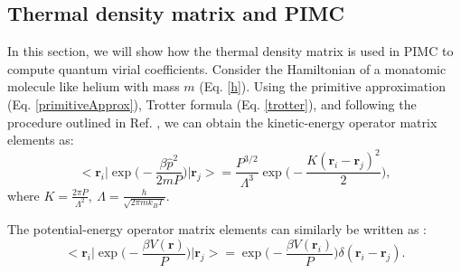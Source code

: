         \subsection{Thermal density matrix and PIMC} \label{connections}
            In this section, we will show how the thermal density matrix is used in PIMC to compute quantum virial coefficients. Consider the Hamiltonian of a monatomic molecule like helium with mass $m$ (Eq. \eqref{h}). Using the primitive approximation (Eq. \eqref{primitiveApprox}), Trotter formula (Eq. \eqref{trotter}), and following the procedure outlined in Ref. \cite{Garberoglio2009}, we can obtain the kinetic-energy operator matrix elements as:
            \begin{equation} \label{kineticOperatorMatrix}
                \Bigg< \bm{r}_i \Bigg| \exp \Bigg(-\displaystyle\frac{\beta \hat{p}^2}{2 m P} \Bigg) \Bigg| \bm{r}_j \Bigg> = \displaystyle\frac{P^{3/2}}{\Lambda^3} \exp \Bigg(-\displaystyle\frac{K (\bm{r}_i - \bm{r}_j)^2}{2}\Bigg),
            \end{equation}
            where $K = \displaystyle\frac{2 \pi P}{\Lambda^2},\: \Lambda = \displaystyle\frac{h}{\sqrt{2\pi m k_B T}}$.

            The potential-energy operator matrix elements can similarly be written as \cite{Cui1997}:
            \begin{equation} \label{potentialOperatorMatrix}
                \Bigg< \bm{r}_i \Bigg| \exp \Bigg(-\displaystyle\frac{\beta V(\bm{r})}{P} \Bigg) \Bigg| \bm{r}_j \Bigg> = \exp \Bigg(-\displaystyle\frac{\beta V(\bm{r}_i)}{P} \Bigg) \delta (\bm{r}_i - \bm{r}_j).
            \end{equation}


